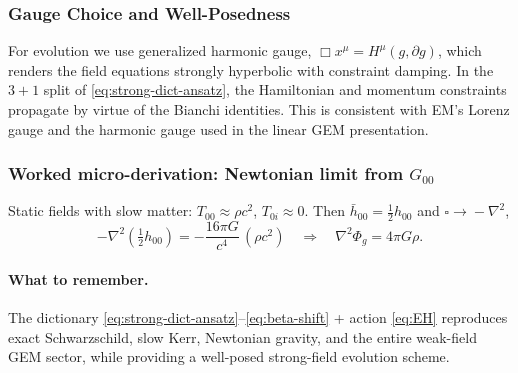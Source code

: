 \subsubsection{Gauge Choice and Well-Posedness}
\label{sec:gauge}
For evolution we use generalized harmonic gauge, $\Box x^\mu=H^\mu(g,\partial g)$, which renders the field equations strongly hyperbolic with constraint damping. In the $3\!+\!1$ split of \eqref{eq:strong-dict-ansatz}, the Hamiltonian and momentum constraints propagate by virtue of the Bianchi identities. This is consistent with EM’s Lorenz gauge and the harmonic gauge used in the linear GEM presentation.

\subsubsection{Worked micro-derivation: Newtonian limit from $G_{00}$}
\label{sec:newtonian-worked}
Static fields with slow matter: $T_{00}\approx \rho c^2$, $T_{0i}\!\approx\!0$. Then $\bar h_{00}=\tfrac12 h_{00}$ and $\square\!\to\! -\nabla^2$,
\[
-\nabla^2\!\left(\tfrac12 h_{00}\right)=-\frac{16\pi G}{c^4}\,(\rho c^2)
\quad\Rightarrow\quad
\nabla^2 \Phi_g = 4\pi G \rho.
\]
\paragraph{What to remember.}
The dictionary \eqref{eq:strong-dict-ansatz}--\eqref{eq:beta-shift} + action \eqref{eq:EH} reproduces exact Schwarzschild, slow Kerr, Newtonian gravity, and the entire weak-field GEM sector, while providing a well-posed strong-field evolution scheme.
